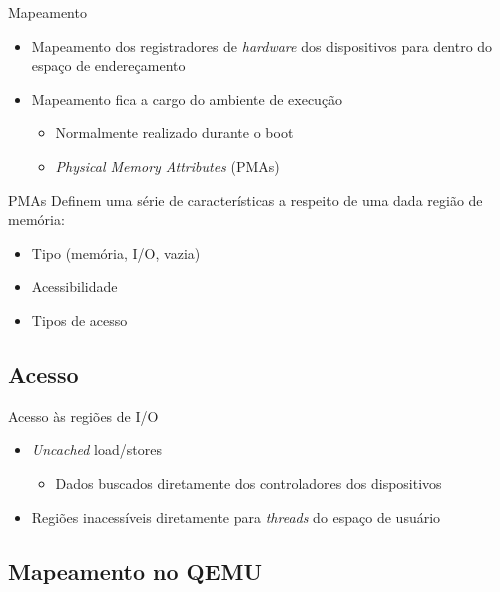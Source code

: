 \documentclass[brazil,nolapesd,aspectratio=169,noartschool]{lapesd-slides}
\begin{document}
	\begin{frame}{Mapeamento}
		\begin{itemize}
			\item Mapeamento dos registradores de \textit{hardware} dos dispositivos
				para dentro do espaço de endereçamento

			\vspace{0.5em}

			\item Mapeamento fica a cargo do ambiente de execução
			\begin{itemize}
				\item Normalmente realizado durante o boot
				\item \textit{Physical Memory Attributes} (PMAs)
			\end{itemize}			
		\end{itemize}
	\end{frame}

	\begin{frame}{PMAs}
		Definem uma série de características a respeito de uma dada região de memória:
		\begin{itemize}
			\item Tipo (memória, I/O, vazia)
			\item Acessibilidade
			\item Tipos de acesso
		\end{itemize}
	\end{frame}


	\subsection{Acesso}

	\begin{frame}{Acesso às regiões de I/O}
		\begin{itemize}
			\item \textit{Uncached} load/stores
			\begin{itemize}
				\item Dados buscados diretamente dos controladores dos dispositivos
			\end{itemize}

			\vspace{0.5em}
			\item Regiões inacessíveis diretamente para \textit{threads} do espaço de usuário
		\end{itemize}
	\end{frame}


	\subsection{Mapeamento no QEMU}
\end{document}
